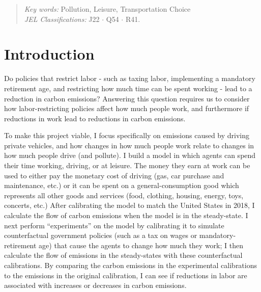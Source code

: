 \documentclass[letter, 12pt, epsf,leqno]{article}
\begin{document}
\begin{abstract}
\noindent
\textit{Key words:}  Pollution, Leisure, Transportation
Choice \\
\textit{JEL Classifications:} J22 $\cdot$ Q54 $\cdot$ R41.


\end{abstract}





\tableofcontents
\newpage





\section{Introduction}
\setcounter{footnote}{1}
\indent
Do policies that restrict labor - such as taxing labor, implementing a mandatory retirement age, and restricting how much time can be spent working - lead to a reduction in carbon emissions?  Answering this question requires us to consider how labor-restricting policies affect how much people work, and furthermore if reductions in work lead to reductions in carbon emissions.  

To make this project viable, I focus specifically on emissions caused by driving private vehicles, and how changes in how much people work relate to changes in how much people drive (and pollute).  I build a model in which agents can spend their time working, driving, or at leisure.  The money they earn at work can be used to either pay the monetary cost of driving (gas, car purchase and maintenance, etc.) or it can be spent on a general-consumption good which represents all other goods and services (food, clothing, housing, energy, toys, concerts, etc.)  After calibrating the model to match the United States in 2018, I calculate the flow of carbon emissions when the model is in the steady-state.  I next perform ``experiments'' on the model by calibrating it to simulate counterfactual government policies (such as a tax on wages or mandatory-retirement age) that cause the agents to change how much they work; I then calculate the flow of emissions in the steady-states with these counterfactual calibrations.  By comparing the carbon emissions in the experimental calibrations to the emissions in the original calibration, I can see if reductions in labor are associated with increases or decreases in carbon emissions.
\end{document}
